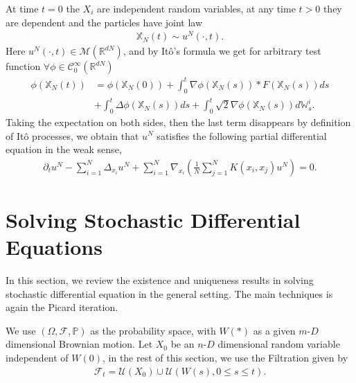 At time $t = 0$ the $X_i$ are independent random variables, at any time $t>0$ they are dependent and the particles have joint law 
\begin{align*}
  \mathbb{X}_N(t) \sim  u^N(\cdot,t)
.\end{align*}
Here $u^N(\cdot,t) \in  \mathcal{M}(\mathbb{R}^{dN})$, and by It\^o's formula we get for arbitrary test function $\forall  \phi  \in  \mathcal{C}_0^{\infty}(\mathbb{R}^{dN} ) $ 
\begin{align*}
  \phi(\mathbb{X}_N(t)) &=  \phi(\mathbb{X}_N(0)) + \int_0^{t} \nabla\phi (\mathbb{X}_N(s)) *F(\mathbb{X}_N(s))ds \\
                        &+ \int_0^{t}  \Delta \phi(\mathbb{X}_N(s))  ds + \int_0^{t} \sqrt{2} \nabla \phi(\mathbb{X}_N(s))  d\mathbb{W}_s^{i} 
.\end{align*}
Taking the expectation on both sides, then the last term disappears by definition of It\^o processes, we obtain that $u^N$ satisfies the following partial differential equation in the weak sense,
\begin{align*}
  \partial_t u^N- \sum_{i=1}^{N} \Delta_{x_i} u^N  + \sum_{i=1}^{N} \nabla_{x_i} \left( \frac{1}{N} \sum_{j=1}^{N} K(x_i,x_j) u^N \right)  = 0
.\end{align*}
\newpage
\section{Solving Stochastic Differential Equations}
In this section, we review the existence and uniqueness results in solving stochastic differential equation in the general setting. The main techniques is again the Picard iteration.

We use $(\Omega ,\mathcal{F},\mathbb{P})$ as the probability space, with $W(*)$ as a given $m$-$D$ dimensional Brownian motion. Let $X_0$ be an $n$-$D$ dimensional random variable independent of $W(0)$, in the rest of this section, we use the Filtration given by
 \begin{align*}
  \mathcal{F}_t = \mathcal{ U}(X_{0}) \cup \mathcal{ U}(W(s) , 0\le s\le t)
 .\end{align*}

